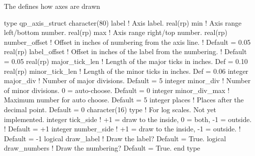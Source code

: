 The  defines how axes are drawn 
\begin{example}
  type qp_axis_struct
    character(80) label       ! Axis label.
    real(rp) min              ! Axis range left/bottom number.
    real(rp) max              ! Axis range right/top number.
    real(rp) number_offset    ! Offset in inches of numbering from the axis line. 
                              !  Default = 0.05
    real(rp) label_offset     ! Offset in inches of the label from the numbering.
                              !  Default = 0.05
    real(rp) major_tick_len   ! Length of the major ticks in inches. Def = 0.10
    real(rp) minor_tick_len   ! Length of the minor ticks in inches. Def = 0.06
    integer major_div         ! Number of major divisions. Default = 5
    integer minor_div         ! Number of minor divisions. 0 = auto-choose. Default = 0
    integer minor_div_max     ! Maximum number for auto choose. Default = 5
    integer places            ! Places after the decimal point. Default = 0
    character(16) type        ! For log scales. Not yet implemented.
    integer tick_side         ! +1 = draw to the inside, 0 = both, -1 = outside.
                              !  Default = +1
    integer number_side       ! +1 = draw to the inside, -1 = outside.
                              !  Default = -1
    logical draw_label        ! Draw the label? Default = True.
    logical draw_numbers      ! Draw the numbering? Default = True.
  end type
\end{example}
